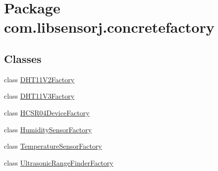 \hypertarget{namespacecom_1_1libsensorj_1_1concretefactory}{}\section{Package com.\+libsensorj.\+concretefactory}
\label{namespacecom_1_1libsensorj_1_1concretefactory}
\subsection*{Classes}
\begin{DoxyCompactItemize}
\item 
class \hyperlink{classcom_1_1libsensorj_1_1concretefactory_1_1DHT11V2Factory}{D\+H\+T11\+V2\+Factory}
\item 
class \hyperlink{classcom_1_1libsensorj_1_1concretefactory_1_1DHT11V3Factory}{D\+H\+T11\+V3\+Factory}
\item 
class \hyperlink{classcom_1_1libsensorj_1_1concretefactory_1_1HCSR04DeviceFactory}{H\+C\+S\+R04\+Device\+Factory}
\item 
class \hyperlink{classcom_1_1libsensorj_1_1concretefactory_1_1HumiditySensorFactory}{Humidity\+Sensor\+Factory}
\item 
class \hyperlink{classcom_1_1libsensorj_1_1concretefactory_1_1TemperatureSensorFactory}{Temperature\+Sensor\+Factory}
\item 
class \hyperlink{classcom_1_1libsensorj_1_1concretefactory_1_1UltrasonicRangeFinderFactory}{Ultrasonic\+Range\+Finder\+Factory}
\end{DoxyCompactItemize}
